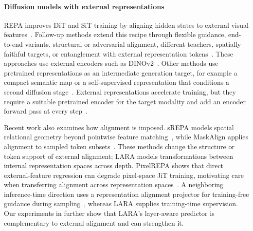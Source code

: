 \paragraph{Diffusion models with external representations}
REPA improves DiT and SiT training by aligning hidden states to external visual features~\citep{yu2024repa}. Follow-up methods extend this recipe through flexible guidance, end-to-end variants, structural or adversarial alignment, different teachers, spatially faithful targets, or entanglement with external representation tokens~\citep{wang2025flexible,wang2025haste,chen2025sara,leng2025repae,wang2026vaerepa,sun2026selftranscendence,singh2025irepa,wu2025reg}. These approaches use external encoders such as DINOv2~\citep{oquab2023dinov2}. Other methods use pretrained representations as an intermediate generation target, for example a compact semantic map or a self-supervised representation that conditions a second diffusion stage~\citep{pernias2024wurstchen,li2024rcg}. External representations accelerate training, but they require a suitable pretrained encoder for the target modality and add an encoder forward pass at every step~\citep{jiang2025sra,haghighi2026layersync}.

Recent work also examines how alignment is imposed. sREPA models spatial relational geometry beyond pointwise feature matching~\citep{xu2026srepa}, while MaskAlign applies alignment to sampled token subsets~\citep{pang2026maskalign}. These methods change the structure or token support of external alignment; LARA models transformations between internal representation spaces across depth. PixelREPA shows that direct external-feature regression can degrade pixel-space JiT training, motivating care when transferring alignment across representation spaces~\citep{shin2026pixelrepa}. A neighboring inference-time direction uses a representation alignment projector for training-free guidance during sampling~\citep{zu2026representationguidance}, whereas LARA supplies training-time supervision. Our experiments in  further show that LARA's layer-aware predictor is complementary to external alignment and can strengthen it.


